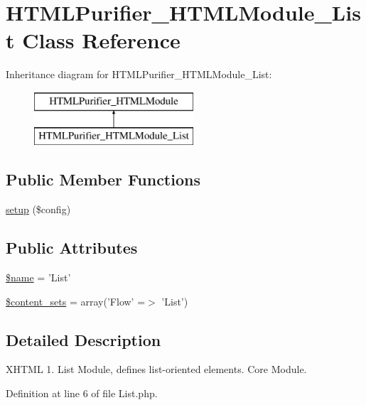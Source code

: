 \hypertarget{classHTMLPurifier__HTMLModule__List}{\section{H\+T\+M\+L\+Purifier\+\_\+\+H\+T\+M\+L\+Module\+\_\+\+List Class Reference}
\label{classHTMLPurifier__HTMLModule__List}
}
Inheritance diagram for H\+T\+M\+L\+Purifier\+\_\+\+H\+T\+M\+L\+Module\+\_\+\+List\+:\begin{figure}[H]
\begin{center}
\leavevmode
\includegraphics[height=2.000000cm]{classHTMLPurifier__HTMLModule__List}
\end{center}
\end{figure}
\subsection*{Public Member Functions}
\begin{DoxyCompactItemize}
\item 
\hyperlink{classHTMLPurifier__HTMLModule__List_a17a814e97b7f4773c53a4b70d5bbca97}{setup} (\$config)
\end{DoxyCompactItemize}
\subsection*{Public Attributes}
\begin{DoxyCompactItemize}
\item 
\hyperlink{classHTMLPurifier__HTMLModule__List_af36f0026c56b02afe9ebb7392836eafe}{\$name} = 'List'
\item 
\hyperlink{classHTMLPurifier__HTMLModule__List_a6d163b1f148ca142fa34b8da005cd514}{\$content\+\_\+sets} = array('Flow' =$>$ 'List')
\end{DoxyCompactItemize}


\subsection{Detailed Description}
X\+H\+T\+M\+L 1. List Module, defines list-\/oriented elements. Core Module. 

Definition at line 6 of file List.\+php.



